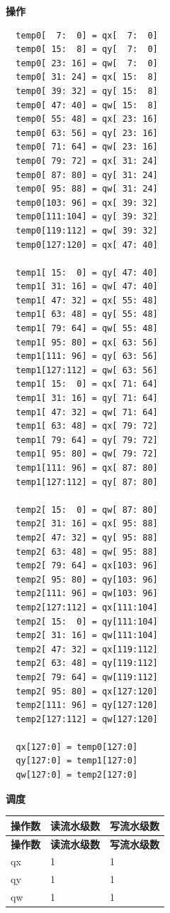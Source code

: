 \textbf{操作}\\
\begin{lstlisting}
  temp0[  7:  0] = qx[  7:  0]
  temp0[ 15:  8] = qy[  7:  0]
  temp0[ 23: 16] = qw[  7:  0]
  temp0[ 31: 24] = qx[ 15:  8]
  temp0[ 39: 32] = qy[ 15:  8]
  temp0[ 47: 40] = qw[ 15:  8]
  temp0[ 55: 48] = qx[ 23: 16]
  temp0[ 63: 56] = qy[ 23: 16]
  temp0[ 71: 64] = qw[ 23: 16]
  temp0[ 79: 72] = qx[ 31: 24]
  temp0[ 87: 80] = qy[ 31: 24]
  temp0[ 95: 88] = qw[ 31: 24]
  temp0[103: 96] = qx[ 39: 32]
  temp0[111:104] = qy[ 39: 32]
  temp0[119:112] = qw[ 39: 32]
  temp0[127:120] = qx[ 47: 40]

  temp1[ 15:  0] = qy[ 47: 40]
  temp1[ 31: 16] = qw[ 47: 40]
  temp1[ 47: 32] = qx[ 55: 48]
  temp1[ 63: 48] = qy[ 55: 48]
  temp1[ 79: 64] = qw[ 55: 48]
  temp1[ 95: 80] = qx[ 63: 56]
  temp1[111: 96] = qy[ 63: 56]
  temp1[127:112] = qw[ 63: 56]
  temp1[ 15:  0] = qx[ 71: 64]
  temp1[ 31: 16] = qy[ 71: 64]
  temp1[ 47: 32] = qw[ 71: 64]
  temp1[ 63: 48] = qx[ 79: 72]
  temp1[ 79: 64] = qy[ 79: 72]
  temp1[ 95: 80] = qw[ 79: 72]
  temp1[111: 96] = qx[ 87: 80]
  temp1[127:112] = qy[ 87: 80]

  temp2[ 15:  0] = qw[ 87: 80]
  temp2[ 31: 16] = qx[ 95: 88]
  temp2[ 47: 32] = qy[ 95: 88]
  temp2[ 63: 48] = qw[ 95: 88]
  temp2[ 79: 64] = qx[103: 96]
  temp2[ 95: 80] = qy[103: 96]
  temp2[111: 96] = qw[103: 96]
  temp2[127:112] = qx[111:104]
  temp2[ 15:  0] = qy[111:104]
  temp2[ 31: 16] = qw[111:104]
  temp2[ 47: 32] = qx[119:112]
  temp2[ 63: 48] = qy[119:112]
  temp2[ 79: 64] = qw[119:112]
  temp2[ 95: 80] = qx[127:120]
  temp2[111: 96] = qy[127:120]
  temp2[127:112] = qw[127:120]

  qx[127:0] = temp0[127:0]
  qy[127:0] = temp1[127:0]
  qw[127:0] = temp2[127:0]
\end{lstlisting}

\textbf{调度}\\
\begin{longtable}[c]{|l|l|l|}
    \hline
    \rowcolor{lightgray}
    \textbf{操作数} & \textbf{读流水级数} & \textbf{写流水级数} \\\hline
    \endfirsthead
    \hline
    \rowcolor{lightgray}
     \textbf{操作数} & \textbf{读流水级数} & \textbf{写流水级数} \\\hline
    \endhead
    \hline
    \endfoot

  qx & 1 & 1 \\\hline
  qy & 1 & 1 \\\hline
  qw & 1 & 1

\end{longtable}


